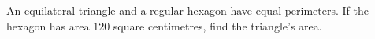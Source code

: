 An equilateral triangle and a regular hexagon have equal perimeters. If the hexagon has area $120$ square centimetres, find the triangle's area.
